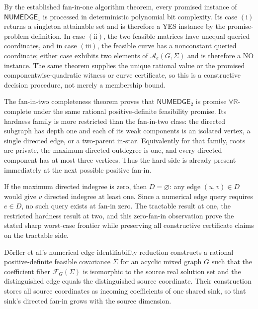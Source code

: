 By the established fan-in-one algorithm theorem, every promised instance of \(\mathsf{NUMEDGE}_1\) is processed in deterministic polynomial bit complexity.  Its case \(\mathrm{(i)}\) returns a singleton attainable set and is therefore a YES instance by the promise-problem definition.  In case \(\mathrm{(ii)}\), the two feasible matrices have unequal queried coordinates, and in case \(\mathrm{(iii)}\), the feasible curve has a nonconstant queried coordinate; either case exhibits two elements of \(\mathcal A_e(G,\Sigma)\) and is therefore a NO instance.  The same theorem supplies the unique rational value or the promised componentwise-quadratic witness or curve certificate, so this is a constructive decision procedure, not merely a membership bound.

The fan-in-two completeness theorem proves that \(\mathsf{NUMEDGE}_2\) is promise \(\forall\mathbb R\)-complete under the same rational positive-definite feasibility promise.  Its hardness family is more restricted than the fan-in-two class: the directed subgraph has depth one and each of its weak components is an isolated vertex, a single directed edge, or a two-parent in-star.  Equivalently for that family, roots are private, the maximum directed outdegree is one, and every directed component has at most three vertices.  Thus the hard side is already present immediately at the next possible positive fan-in.

If the maximum directed indegree is zero, then \(D=\varnothing\): any edge \((u,v)\in D\) would give \(v\) directed indegree at least one.  Since a numerical edge query requires \(e\in D\), no such query exists at fan-in zero.  The tractable result at one, the restricted hardness result at two, and this zero-fan-in observation prove the stated sharp worst-case frontier while preserving all constructive certificate claims on the tractable side.

Dörfler et al.'s numerical edge-identifiability reduction constructs a rational positive-definite feasible covariance \(\Sigma\) for an acyclic mixed graph \(G\) such that the coefficient fiber \(\mathcal F_G(\Sigma)\) is isomorphic to the source real solution set and the distinguished edge equals the distinguished source coordinate.  Their construction stores all source coordinates as incoming coefficients of one shared sink, so that sink's directed fan-in grows with the source dimension.


